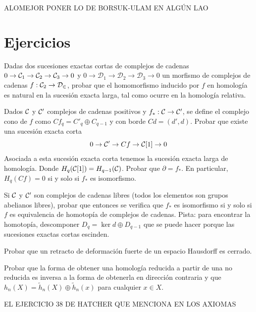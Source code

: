 \documentclass[TA.tex]{subfiles}
\begin{document}
ALOMEJOR PONER LO DE BORSUK-ULAM EN ALGÚN LAO


\section{Ejercicios}
\begin{ejer}
Dadas dos sucesiones exactas cortas de complejos de cadenas $0\to \mathcal{C}_1\to \mathcal{C}_2\to\mathcal{C}_3\to 0$ y $0\to \mathcal{D}_1\to \mathcal{D}_2\to\mathcal{D}_3\to 0$ un morfismo de complejos de cadenas $f:\mathcal{C}_2\to\mathcal{D_2}$, probar que el homomorfismo inducido por $f$ en homología es natural en la sucesión exacta larga, tal como ocurre en la homología relativa. 
\end{ejer}

\begin{ejer}
Dados $\mathcal{C}$ y $\mathcal{C}'$ complejos de cadenas positivos y $f_*:\mathcal{C}\to\mathcal{C}'$, se define el complejo cono de $f$ como $Cf_q=C'_q\oplus C_{q-1}$ y con borde $Cd=(d',d)$. Probar que existe una sucesión exacta corta
\[
0\to \mathcal{C}'\to Cf\to \mathcal{C}[1]\to 0
\]
Asociada a esta sucesión exacta corta tenemos la sucesión exacta larga de homología. Donde $H_q(\mathcal{C}[1])=H_{q-1}(\mathcal{C})$. Probar que $\partial=f_*$. En particular, $H_q(Cf)=0$ si y solo si $f_*$ es isomorfismo. 

Si $\mathcal{C}$ y $\mathcal{C}'$ son complejos de cadenas libres (todos los elementos son grupos abelianos libres), probar que entonces se verifica que $f_*$ es isomorfismo si y solo si $f$ es equivalencia de homotopía de complejos de cadenas.  Pista: para encontrar la homotopía, descomponer $D_q=\ker d\oplus D_{q-1}$ que se puede hacer porque las sucesiones exactas cortas escinden. 

\end{ejer}
\begin{ejer}
Probar que un retracto de deformación fuerte de un espacio Hausdorff es cerrado.
\end{ejer}

\begin{ejer}
Probar que la forma de obtener una homología reducida a partir de una no reducida es inversa a la forma de obtenerla en dirección contraria y que $h_n(X)=\tilde{h}_n(X)\oplus\tilde{h}_n(x)$ para cualquier $x\in X$.
\end{ejer}

\begin{ejer}
EL EJERCICIO 38 DE HATCHER QUE MENCIONA EN LOS AXIOMAS
\end{ejer}
\end{document}
